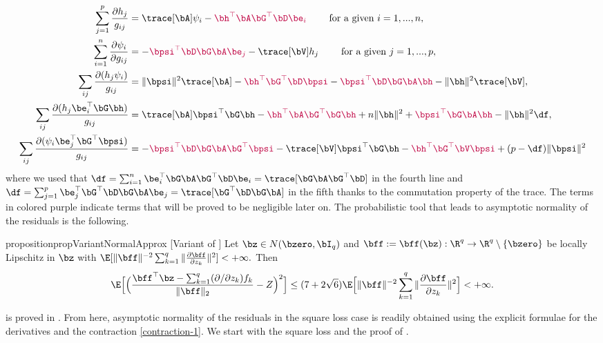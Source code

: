 \documentclass{colt2022} %
\numberwithin{equation}{section}
\begin{document}
\begin{align}
    \sum_{j=1}^p
    \frac{\partial h_j}{g_{ij}}
    &=
    \trace[\bA] \psi_i
    - {\color{purple}\bh^\top\bA\bG^\top\bD\be_i}
    \qquad \text{ for a given $i=1,...,n$},
    \label{contraction-1}
    \\
    \sum_{i=1}^n
    \frac{\partial \psi_i}{\partial g_{ij}}
    &=
    -{\color{purple}\bpsi^\top\bD\bG\bA\be_j}
    - \trace[\bV] h_j
    \qquad \text{ for a given $j=1,...,p$},
    \label{contraction-2}
    \\\sum_{ij}
    \frac{\partial (h_j \psi_i)}{g_{ij}}
    &= 
    \|\bpsi\|^2 \trace[\bA]
    - {\color{purple}\bh^\top\bG^\top\bD\bpsi}
    - {\color{purple}\bpsi^\top\bD\bG\bA\bh}
    -  \|\bh\|^2 \trace[\bV],
    \label{contraction-3}
\\
    \sum_{ij}
    \frac{\partial (h_j \be_i^\top\bG\bh)}{g_{ij}}
    &=
    \trace[\bA] \bpsi^\top\bG\bh
    -{\color{purple}\bh^\top\bA\bG^\top\bG\bh}
    + n\|\bh\|^2
    +
    {\color{purple}\bpsi^\top\bG\bA\bh}
    -
    \|\bh\|^2\df,
    \label{contraction-4}
    \\
    \sum_{ij}
    \frac{\partial (\psi_i \be_j^\top\bG^\top\bpsi)}{g_{ij}}
    &=
    - {\color{purple}\bpsi^\top\bD\bG\bA\bG^\top\bpsi}
    - \trace[\bV] \bpsi^\top\bG\bh
    - {\color{purple}\bh^\top\bG^\top\bV\bpsi}
     +(p-\df) \|\bpsi\|^2
    \label{contraction-5}
\end{align}
where we used that $\df=
\sum_{i=1}^n\be_i^\top\bG\bA\bG^\top\bD\be_i
=
\trace[\bG\bA\bG^\top\bD]$
in the fourth line
and $\df=\sum_{j=1}^p \be_j^\top\bG^\top\bD\bG\bA\be_j = \trace[\bG^\top\bD\bG\bA]$ in the fifth thanks to the commutation property of the trace.
The terms in colored purple indicate terms that will
be proved to be negligible later on. The probabilistic tool
that leads to asymptotic normality of the residuals is the following.

\begin{restatable}{proposition}{propVariantNormalApprox}
    [Variant of \cite{bellec_zhang2019second_poincare}]
    \label{prop:a-lemma}
    Let $\bz \in N(\bzero, \bI_{q})$ and $\bff := \bff (\bz) : \R ^{q} \to \R^{q} \setminus \{\bzero\}$ be locally 
    Lipschitz in $\bz$ with 
    $ 
    \E [ \| \bff \|^{-2}\sum_{k=1}^q \| \frac{\partial \bff}{\partial z_k} \|^{2} ] < +\infty.
    $
    Then 
    \begin{align}
        \label{eq:rhs-stein-normality}
        \E 
        \Bigl[
             \Bigl(
                 \frac{ \bff ^{\top} \bz - \sum_{k=1}^q(\partial/\partial z_k) f_k }{ \| \bff \|_{2} }
                  - 
                  Z
             \Bigr)^{2}
        \Bigr]
        \leq 
        ( 7  + 2 \sqrt{6} )
    \E \Bigl[ \| \bff \|^{-2}\sum_{k=1}^q \| \frac{\partial \bff}{\partial z_k} \|^{2} \Bigr] 
    < +\infty.
    \end{align}
\end{restatable}
 is proved in .
From here, asymptotic normality of the residuals in the square loss
case is readily obtained using the explicit formulae for the derivatives
and the contraction \eqref{contraction-1}. We start with the square loss
and the proof of .
\end{document}
